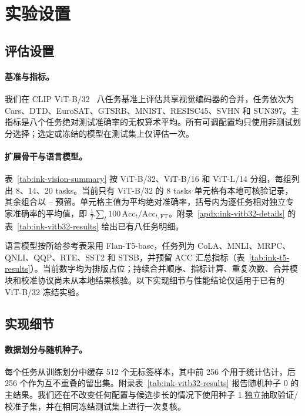 \section{实验设置}
\label{sec:ink-experiments}

\subsection{评估设置}

\paragraph{基准与指标。}
我们在 CLIP ViT-B/32~\citep{radford2021learning} 八任务基准上评估共享视觉编码器的合并，任务依次为 Cars、DTD、EuroSAT、GTSRB、MNIST、RESISC45、SVHN 和 SUN397。主指标是八个任务绝对测试准确率的无权算术平均。所有可调配置均只使用非测试划分选择；选定或冻结的模型在测试集上仅评估一次。

\paragraph{扩展骨干与语言模型。}
表~\ref{tab:ink-vision-summary} 按 ViT-B/32、ViT-B/16 和 ViT-L/14 分组，每组列出 8、14、20 tasks。当前只有 ViT-B/32 的 8 tasks 单元格有本地可核验记录，其余组合以 -- 预留。单元格主值为平均绝对准确率，括号内为逐任务相对独立专家准确率的平均值，即 $\frac{1}{T}\sum_t100\,\mathrm{Acc}_t/\mathrm{Acc}_{t,\mathrm{FT}}$。附录~\ref{apdx:ink-vitb32-details} 的表~\ref{tab:ink-vitb32-results} 给出已有八任务明细。

语言模型按所给参考表采用 Flan-T5-base，任务列为 CoLA、MNLI、MRPC、QNLI、QQP、RTE、SST2 和 STSB，并预留 ACC 汇总指标（表~\ref{tab:ink-t5-results}）。当前数字均为排版占位；持续合并顺序、指标计算、重复次数、合并模块和校准协议尚未从本地结果核验。以下实现细节与性能结论仅适用于已有的 ViT-B/32 冻结实验。

\subsection{实现细节}

\paragraph{数据划分与随机种子。}
每个任务从训练划分中缓存 512 个无标签样本，其中前 256 个用于统计估计，后 256 个作为互不重叠的留出集。附录表~\ref{tab:ink-vitb32-results} 报告随机种子 0 的主结果。我们还在不改变任何配置与候选步长的情况下使用种子 1 独立抽取验证/校准子集，并在相同冻结测试集上进行一次复核。

